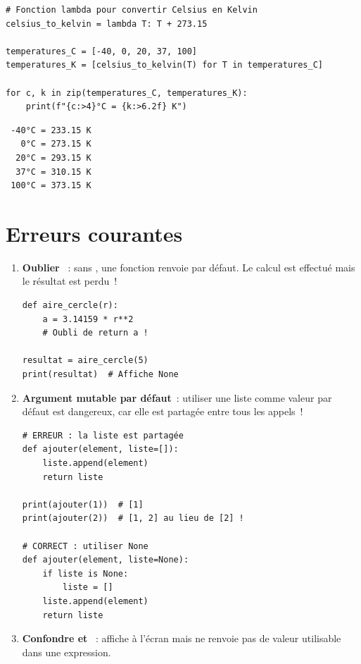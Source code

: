 \begin{codeblock}[title=\textbf{Python}]
\begin{verbatim}
# Fonction lambda pour convertir Celsius en Kelvin
celsius_to_kelvin = lambda T: T + 273.15

temperatures_C = [-40, 0, 20, 37, 100]
temperatures_K = [celsius_to_kelvin(T) for T in temperatures_C]

for c, k in zip(temperatures_C, temperatures_K):
    print(f"{c:>4}°C = {k:>6.2f} K")
\end{verbatim}
\end{codeblock}

\begin{codeoutput}
\begin{verbatim}
 -40°C = 233.15 K
   0°C = 273.15 K
  20°C = 293.15 K
  37°C = 310.15 K
 100°C = 373.15 K
\end{verbatim}
\end{codeoutput}

\section{Erreurs courantes}

\begin{errmark}
\begin{enumerate}
    \item \textbf{Oublier }~: sans , une fonction renvoie
     par d\'efaut. Le calcul est effectu\'e mais le r\'esultat est perdu~!
    \begin{verbatim}
def aire_cercle(r):
    a = 3.14159 * r**2
    # Oubli de return a !

resultat = aire_cercle(5)
print(resultat)  # Affiche None
    \end{verbatim}

    \item \textbf{Argument mutable par d\'efaut}~: utiliser une liste comme valeur
    par d\'efaut est dangereux, car elle est partag\'ee entre tous les appels~!
    \begin{verbatim}
# ERREUR : la liste est partagée
def ajouter(element, liste=[]):
    liste.append(element)
    return liste

print(ajouter(1))  # [1]
print(ajouter(2))  # [1, 2] au lieu de [2] !

# CORRECT : utiliser None
def ajouter(element, liste=None):
    if liste is None:
        liste = []
    liste.append(element)
    return liste
    \end{verbatim}

    \item \textbf{Confondre  et }~:  affiche \`a l'\'ecran
    mais ne renvoie pas de valeur utilisable dans une expression.
\end{enumerate}
\end{errmark}

